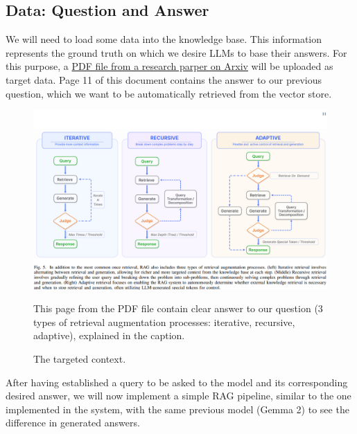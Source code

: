 \subsection{Data: Question and Answer}
We will need to load some data into the knowledge base. This information represents the ground truth on which we desire LLMs to base their answers.\newline
For this purpose, a \href{https://arxiv.org/abs/2312.10997}{PDF file from a research parper on Arxiv} will be uploaded as target data. Page 11 of this document contains the answer to our previous question, which we want to be automatically retrieved from the vector store.
\begin{figure}[H]
    \centering
    \includegraphics[width=\linewidth]{./figures/toberetrieved.png}
    \caption{The targeted context.}
    \begin{flushleft}
        \small This page from the PDF file contain clear answer to our question (3 types of retrieval augmentation processes: iterative, recursive, adaptive), explained in the caption.
    \end{flushleft}
\end{figure}
After having established a query to be asked to the model and its corresponding desired answer, we will now implement a simple RAG pipeline, similar to the one implemented in the system, with the same previous model (Gemma 2) to see the difference in generated answers.
